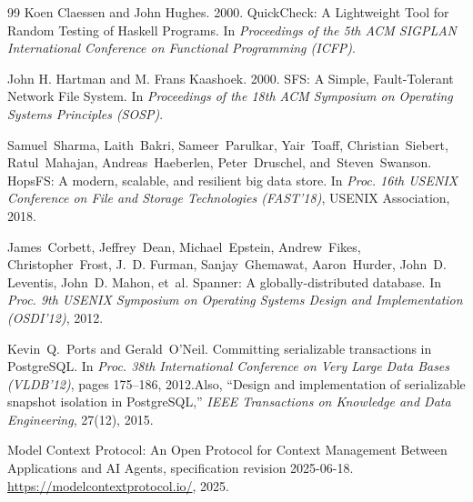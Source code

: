 \documentclass[numberedsection,acmtos]{acmart}
\begin{document}
\begin{thebibliography}{99}
Koen Claessen and John Hughes. 2000. QuickCheck: A Lightweight Tool for
Random Testing of Haskell Programs. In \emph{Proceedings of the 5th ACM SIGPLAN
International Conference on Functional Programming (ICFP)}.

John H. Hartman and M. Frans Kaashoek. 2000. SFS: A Simple, Fault-Tolerant
Network File System. In \emph{Proceedings of the 18th ACM Symposium on
Operating Systems Principles (SOSP)}.

Samuel~Sharma, Laith~Bakri, Sameer~Parulkar, Yair~Toaff, Christian~Siebert,
Ratul~Mahajan, Andreas~Haeberlen, Peter~Druschel, and~Steven~Swanson.\newblock
{HopsFS}: A modern, scalable, and resilient big data store.\newblock
In \emph{Proc. 16th USENIX Conference on File and Storage Technologies (FAST'18)},
USENIX Association, 2018.

James~Corbett, Jeffrey~Dean, Michael~Epstein, Andrew~Fikes,
Christopher~Frost, J.~D. Furman, Sanjay~Ghemawat, Aaron~Hurder,
John~D. Leventis, John~D. Mahon, et~al.\newblock
{Spanner}: A globally-distributed database.\newblock
In \emph{Proc. 9th USENIX Symposium on Operating Systems Design and
Implementation (OSDI'12)}, 2012.

Kevin~Q.~Ports and Gerald~O'Neil.\newblock
Committing serializable transactions in {PostgreSQL}.\newblock
In \emph{Proc. 38th International Conference on Very Large Data Bases
(VLDB'12)}, pages 175--186, 2012.\newblock Also, ``Design and
implementation of serializable snapshot isolation in {PostgreSQL},''
\emph{IEEE Transactions on Knowledge and Data Engineering}, 27(12), 2015.

{Model Context Protocol}: An Open Protocol for Context Management Between
Applications and AI Agents, specification revision 2025-06-18.
\newblock \url{https://modelcontextprotocol.io/}, 2025.

\end{thebibliography}
\end{document}
